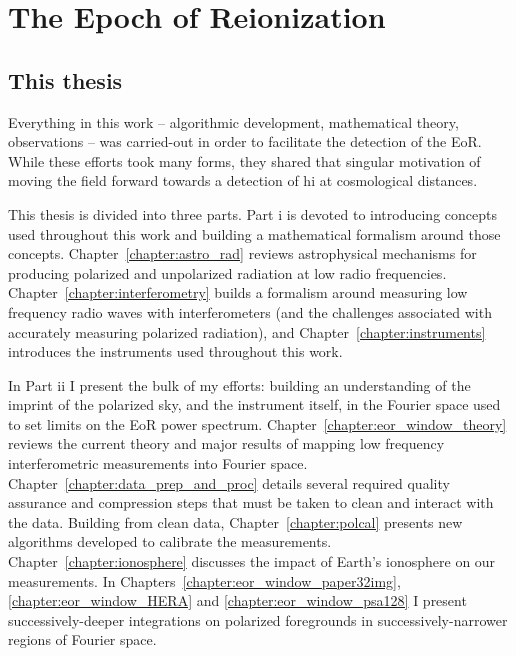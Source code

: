 \chapter{The Epoch of Reionization}
\label{chapter:eor_intro}





\section{This thesis}

Everything in this work -- algorithmic development, mathematical theory, observations -- was carried-out in order to facilitate the detection of the EoR. While these efforts took many forms, they shared that singular motivation of moving the field forward towards a detection of {\sc hi} at cosmological distances. 

This thesis is divided into three parts. Part {\sc i} is devoted to introducing concepts used throughout this work and building a mathematical formalism around those concepts. 
Chapter~\ref{chapter:astro_rad} reviews astrophysical mechanisms for producing polarized and unpolarized radiation at low radio frequencies. 
Chapter~\ref{chapter:interferometry} builds a formalism around measuring low frequency radio waves with interferometers (and the challenges associated with accurately measuring polarized radiation), and Chapter~\ref{chapter:instruments} introduces the instruments used throughout this work.

In Part {\sc ii} I present the bulk of my efforts: building an understanding of the imprint of the polarized sky, and the instrument itself, in the Fourier space used to set limits on the EoR power spectrum. 
Chapter~\ref{chapter:eor_window_theory} reviews the current theory and major results of mapping low frequency interferometric measurements into Fourier space. 
Chapter~\ref{chapter:data_prep_and_proc} details several required quality assurance and compression steps that must be taken to clean and interact with the data. Building from clean data, Chapter~\ref{chapter:polcal} presents new algorithms developed to calibrate the measurements.
Chapter~\ref{chapter:ionosphere} discusses the impact of Earth's ionosphere on our measurements.
In Chapters~\ref{chapter:eor_window_paper32img}, \ref{chapter:eor_window_HERA} and \ref{chapter:eor_window_psa128} I present successively-deeper integrations on polarized foregrounds in successively-narrower regions of Fourier space.

